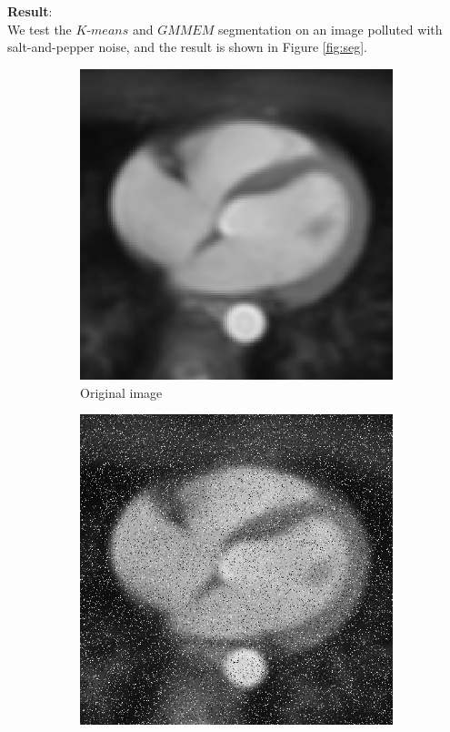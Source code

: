 \documentclass[UTF8]{ctexart}
\begin{document}
\textbf{Result}:\\
We test the $\textit{K-means}$ and $\textit{GMMEM}$ segmentation on an image polluted with salt-and-pepper noise, and the result is shown in Figure \ref{fig:seg}.\\
\begin{figure}[htbp]
    \centering
    \begin{subfigure}{0.3\textwidth}
        \centering
        \includegraphics[width=0.8\linewidth]{heartimg.png}
        \caption{Original image}
    \end{subfigure}%
    \hfill
    \begin{subfigure}{0.3\textwidth}
        \centering
        \includegraphics[width=0.8\linewidth]{heart_noised.png}

\end{subfigure}
\end{figure}
\end{document}
